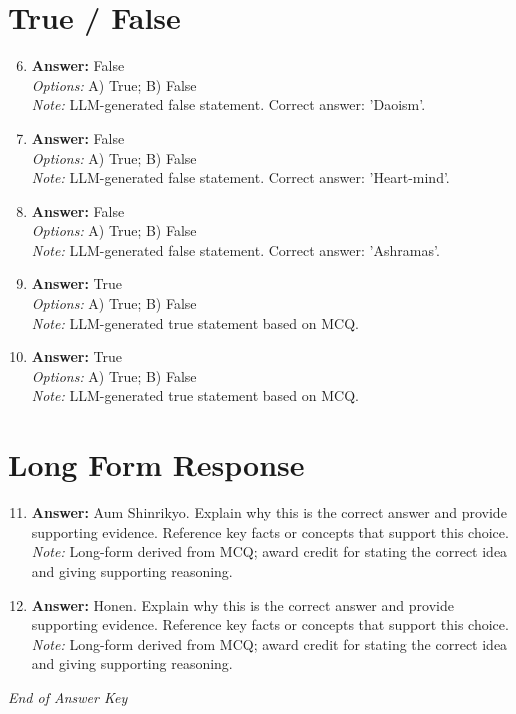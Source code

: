 \documentclass[12pt]{article}
\begin{document}
\section*{True / False}
\begin{enumerate}[label=\arabic*.]
\setcounter{enumi}{5}
\item \textbf{Answer:} False
\\ \textit{Options:} A) True; B) False
\\ \textit{Note:} LLM-generated false statement. Correct answer: 'Daoism'.
\item \textbf{Answer:} False
\\ \textit{Options:} A) True; B) False
\\ \textit{Note:} LLM-generated false statement. Correct answer: 'Heart-mind'.
\item \textbf{Answer:} False
\\ \textit{Options:} A) True; B) False
\\ \textit{Note:} LLM-generated false statement. Correct answer: 'Ashramas'.
\item \textbf{Answer:} True
\\ \textit{Options:} A) True; B) False
\\ \textit{Note:} LLM-generated true statement based on MCQ.
\item \textbf{Answer:} True
\\ \textit{Options:} A) True; B) False
\\ \textit{Note:} LLM-generated true statement based on MCQ.
\end{enumerate}

\section*{Long Form Response}
\begin{enumerate}[label=\arabic*.]
\setcounter{enumi}{10}
\item \textbf{Answer:} Aum Shinrikyo. Explain why this is the correct answer and provide supporting evidence. Reference key facts or concepts that support this choice.
\\ \textit{Note:} Long-form derived from MCQ; award credit for stating the correct idea and giving supporting reasoning.
\item \textbf{Answer:} Honen. Explain why this is the correct answer and provide supporting evidence. Reference key facts or concepts that support this choice.
\\ \textit{Note:} Long-form derived from MCQ; award credit for stating the correct idea and giving supporting reasoning.
\end{enumerate}

\vfill
\noindent\textit{End of Answer Key}
\end{document}
